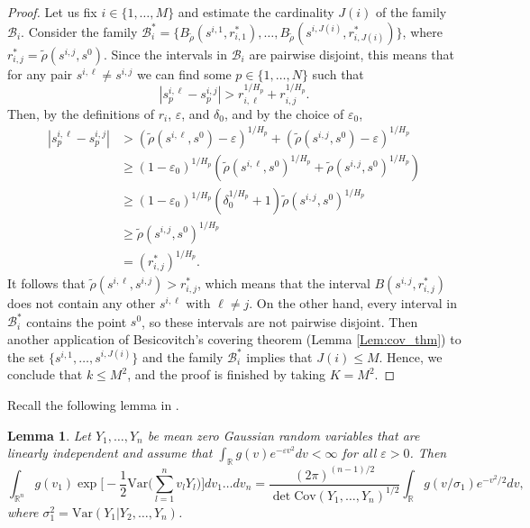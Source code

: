 \documentclass[11pt, reqno]{amsart}
\newtheorem{lemma}[theorem]{Lemma}
\def\R{{\mathbb R}}
\numberwithin{equation}{section}
\begin{document}
\begin{proof}
Let us fix $i \in \{1, \ldots, M\}$ and estimate the cardinality $J(i)$ of the family $\mathscr{B}_i$. Consider the family $\mathscr{B}_i^* 
= \{ B_{\tilde{\rho}}(s^{i,1}, r^*_{i,1}), \dots, B_{\tilde{\rho}}(s^{i,J(i)}, r^*_{i, J(i)}) \}$, where $r^*_{i,j} = \tilde{\rho}(s^{i,j}, s^0)$.
Since the intervals in $\mathscr{B}_i$ are pairwise disjoint, this means that for any pair $s^{i,\ell} \ne s^{i,j}$ we 
can find some $p \in \{1, \dots, N\}$ such that 
\[ |s^{i,\ell}_p - s^{i,j}_p| > r_{i,\ell}^{1/H_p} + r_{i,j}^{1/H_p}. \]
Then, by the definitions of $r_i$, $\varepsilon$, and $\delta_0$, and by the choice of $\varepsilon_0$,
\begin{align*}
|s^{i,\ell}_p - s^{i,j}_p| &> (\tilde{\rho}(s^{i,\ell}, s^0)- \varepsilon)^{1/H_p} + 
(\tilde{\rho}(s^{i,j}, s^0)- \varepsilon)^{1/H_p}\\
& \ge (1-\varepsilon_0)^{1/H_p} \left(\tilde{\rho}(s^{i,\ell}, s^0)^{1/H_p} + 
\tilde{\rho}(s^{i,j}, s^0)^{1/H_p}\right)\\
& \ge (1-\varepsilon_0)^{1/H_p} (\delta_0^{1/H_p} + 1) \tilde{\rho}(s^{i,j}, s^0)^{1/H_p}\\
& \ge \tilde{\rho}(s^{i,j}, s^0)^{1/H_p}\\
& = (r_{i,j}^*)^{1/H_p}.
\end{align*}
It follows that $\tilde{\rho}(s^{i,\ell}, s^{i,j}) > r_{i,j}^*$, which means that the interval $B(s^{i,j}, r^*_{i,j})$ does not contain 
any other $s^{i,\ell}$ with $\ell \ne j$. On the other hand, every interval in $\mathscr{B}^*_i$ contains the point $s^0$, 
so these intervals are not pairwise disjoint. Then another application of Besicovitch's covering theorem (Lemma 
\ref{Lem:cov_thm}) to the set $\{ s^{i,1}, \dots, s^{i,J(i)} \}$ and the family $\mathscr{B}_i^*$ implies that $J(i) \le M$. 
Hence, we conclude that $k \le M^2$, and the proof is finished by taking $K = M^2$.
\end{proof}

Recall the following lemma in \cite[Lemma 2]{CD82}.

\begin{lemma}\label{Lem:CD82}
Let $Y_1, \dots, Y_n$ be mean zero Gaussian random variables that are linearly independent and assume that 
$\int_\R g(v) e^{-\varepsilon v^2} dv < \infty$ for all $\varepsilon > 0$. Then
\[ \int_{\R^n} g(v_1) \exp\bigg[ -\frac{1}{2} \mathrm{Var}\bigg( \sum_{l=1}^n v_l Y_l \bigg) \bigg] dv_1 \dots dv_n 
= \frac{(2\pi)^{(n-1)/2}}{\det\mathrm{Cov}(Y_1, \dots, Y_n)^{1/2}}
\int_\R g(v/\sigma_1) e^{-v^2/2} dv, \]
where $\sigma_1^2 = \mathrm{Var}(Y_1|Y_2, \dots, Y_n)$.
\end{lemma}
\end{document}
